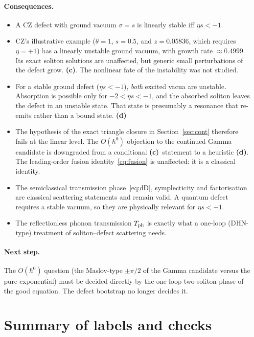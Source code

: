 \documentclass[11pt,a4paper]{article}
\newcommand{\Lc}{\textsf{\textbf{(c)}}}\newcommand{\Ld}{\textsf{\textbf{(d)}}}
\begin{document}
\paragraph{Consequences.}
\begin{itemize}
\item A CZ defect with ground vacuum $\sigma=s$ is linearly stable iff $\eta s<-1$.
\item CZ's illustrative example ($\theta=1$, $s=0.5$, and $z=0.05836$, which requires $\eta=+1$) has a linearly unstable ground vacuum, with growth rate $\approx0.4999$. Its exact soliton solutions are unaffected, but generic small perturbations of the defect grow. \Lc. The nonlinear fate of the instability was not studied.
\item For a stable ground defect ($\eta s<-1$), \emph{both} excited vacua are unstable. Absorption is possible only for $-2<\eta s<-1$, and the absorbed soliton leaves the defect in an unstable state. That state is presumably a resonance that re-emits rather than a bound state. \Ld
\item The hypothesis of the exact triangle closure in Section~\ref{sec:cont} therefore fails at the linear level. The $O(\hbar^0)$ objection to the continued Gamma candidate is downgraded from a conditional \Lc\ statement to a heuristic \Ld. The leading-order fusion identity~\eqref{eq:fusion} is unaffected: it is a classical identity.
\item The semiclassical transmission phase~\eqref{eq:dD}, symplecticity and factorisation are classical scattering statements and remain valid. A quantum defect requires a stable vacuum, so they are physically relevant for $\eta s<-1$.
\item The reflectionless phonon transmission $T_{\rm ph}$ is exactly what a one-loop (DHN-type) treatment of soliton--defect scattering needs.
\end{itemize}

\paragraph{Next step.} The $O(\hbar^0)$ question (the Maslov-type $\pm\pi/2$ of the Gamma candidate versus the pure exponential) must be decided directly by the one-loop two-soliton phase of the good equation. The defect bootstrap no longer decides it.

\section{Summary of labels and checks}
\end{document}

